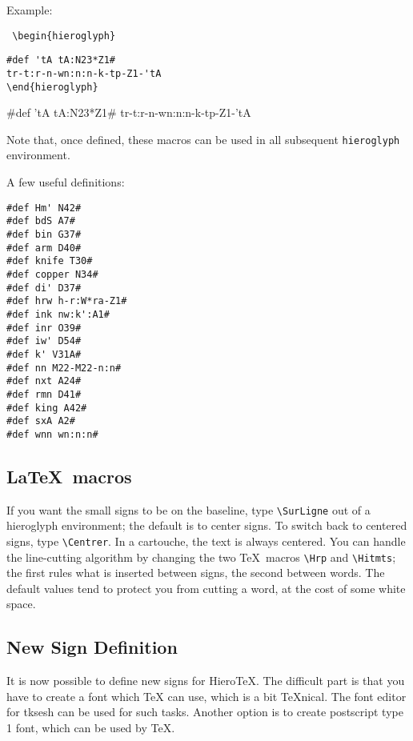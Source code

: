 \documentclass[final]{article}
\newcommand{\HieroTeX}{Hiero\TeX{}}
\begin{document}
Example:

\begin{minipage}{15em}
\tt
\noindent\verb|\begin{|hierogl{}yph\verb|}| %
\vspace{-2ex}
\begin{verbatim}
#def 'tA tA:N23*Z1#
tr-t:r-n-wn:n:n-k-tp-Z1-'tA
\end{hieroglyph}
\end{verbatim}
\end{minipage}
\vspace{1ex}

\begin{hieroglyph}
#def 'tA tA:N23*Z1#
tr-t:r-n-wn:n:n-k-tp-Z1-'tA
\end{hieroglyph}
\vspace{1ex}

{\sloppy{} Note that, once defined, these macros can be used in all
  subsequent \verb|hieroglyph| environment.  }
\fussy

A few useful definitions: 
\begin{verbatim}
#def Hm' N42#
#def bdS A7#
#def bin G37#
#def arm D40#
#def knife T30#
#def copper N34#
#def di' D37#
#def hrw h-r:W*ra-Z1#
#def ink nw:k':A1#
#def inr O39#
#def iw' D54#
#def k' V31A#
#def nn M22-M22-n:n#
#def nxt A24#
#def rmn D41#
#def king A42#
#def sxA A2#
#def wnn wn:n:n#
\end{verbatim}

\subsection{\LaTeX\ macros}

If you want the small signs to be on the baseline, type
\verb|\SurLigne| out of a hieroglyph environment; the default is to
center signs. To switch back to centered signs, type \verb|\Centrer|.
In a cartouche, the text is always centered. You can handle the
line-cutting algorithm by changing the two \TeX\ macros
\verb|\Hrp| and \verb|\Hitmts|; the first rules what is
inserted between signs, the second between words.  The default values
tend to protect you from cutting a word, at the cost of some white
space.



\subsection{New Sign Definition}

It is now possible to define new signs for \HieroTeX{}. The difficult
part is that you have to create a font which \TeX{} can use, which is
a bit \TeX{}nical. The font editor for tksesh can be used for such
tasks. Another option is to create postscript type 1 font, which can be used by \TeX{}.
\end{document}

